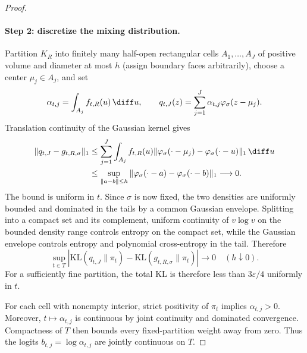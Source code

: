 \begin{proof}
\paragraph{Step 2: discretize the mixing distribution.}
Partition $K_R$ into finitely many half-open rectangular cells
$A_1,\ldots,A_J$ of positive volume and diameter at most $h$ (assign boundary
faces arbitrarily), choose a center $\mu_j\in A_j$, and set
\[
 \alpha_{t,j}=\int_{A_j}f_{t,R}(u)\,\diff u,
 \qquad
 q_{t,J}(z)=\sum_{j=1}^J\alpha_{t,j}
 \varphi_\sigma(z-\mu_j).
\]
Translation continuity of the Gaussian kernel gives
\begin{align*}
 \|q_{t,J}-g_{t,R,\sigma}\|_1
 &\le\sum_{j=1}^J\int_{A_j}f_{t,R}(u)
 \|\varphi_\sigma(\cdot-\mu_j)-
 \varphi_\sigma(\cdot-u)\|_1\,\diff u\\
 &\le\sup_{\|a-b\|\le h}
 \|\varphi_\sigma(\cdot-a)-\varphi_\sigma(\cdot-b)\|_1
 \longrightarrow0.
\end{align*}
The bound is uniform in $t$.  Since $\sigma$ is now fixed, the two densities
are uniformly bounded and dominated in the tails by a common Gaussian
envelope.  Splitting into a compact set and its complement, uniform
continuity of $v\log v$ on the bounded density range controls entropy on the
compact set, while the Gaussian envelope controls entropy and polynomial
cross-entropy in the tail.  Therefore
\[
 \sup_{t\in T}\left|
 \mathrm{KL}(q_{t,J}\|\pi_t)
 -\mathrm{KL}(g_{t,R,\sigma}\|\pi_t)\right|\longrightarrow0
 \quad(h\downarrow0).
\]
For a sufficiently fine partition, the total KL is therefore less than
$3\varepsilon/4$ uniformly in $t$.

For each cell with nonempty interior, strict positivity of $\pi_t$ implies
$\alpha_{t,j}>0$.  Moreover, $t\mapsto\alpha_{t,j}$ is continuous by joint
continuity and dominated convergence.  Compactness of $T$ then bounds every
fixed-partition weight away from zero.  Thus the logits
$b_{t,j}=\log\alpha_{t,j}$ are jointly continuous on $T$.


\end{proof}
